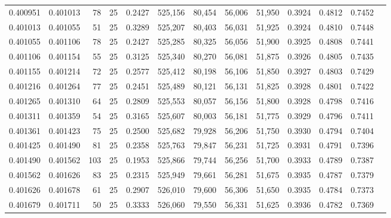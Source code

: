 \begin{tabular}{rrrrrrrrrrrrr}
0.400951 & 0.401013 &    78 &  25 &                                     0.2427 & 525,156 &  80,454 &  56,006 &  51,950 & 0.3924 & 0.4812 & 0.7452 \\
0.401013 & 0.401055 &    51 &  25 &                                     0.3289 & 525,207 &  80,403 &  56,031 &  51,925 & 0.3924 & 0.4810 & 0.7448 \\
0.401055 & 0.401106 &    78 &  25 &                                     0.2427 & 525,285 &  80,325 &  56,056 &  51,900 & 0.3925 & 0.4808 & 0.7441 \\
0.401106 & 0.401154 &    55 &  25 &                                     0.3125 & 525,340 &  80,270 &  56,081 &  51,875 & 0.3926 & 0.4805 & 0.7435 \\
0.401155 & 0.401214 &    72 &  25 &                                     0.2577 & 525,412 &  80,198 &  56,106 &  51,850 & 0.3927 & 0.4803 & 0.7429 \\
0.401216 & 0.401264 &    77 &  25 &                                     0.2451 & 525,489 &  80,121 &  56,131 &  51,825 & 0.3928 & 0.4801 & 0.7422 \\
0.401265 & 0.401310 &    64 &  25 &                                     0.2809 & 525,553 &  80,057 &  56,156 &  51,800 & 0.3928 & 0.4798 & 0.7416 \\
0.401311 & 0.401359 &    54 &  25 &                                     0.3165 & 525,607 &  80,003 &  56,181 &  51,775 & 0.3929 & 0.4796 & 0.7411 \\
0.401361 & 0.401423 &    75 &  25 &                                     0.2500 & 525,682 &  79,928 &  56,206 &  51,750 & 0.3930 & 0.4794 & 0.7404 \\
0.401425 & 0.401490 &    81 &  25 &                                     0.2358 & 525,763 &  79,847 &  56,231 &  51,725 & 0.3931 & 0.4791 & 0.7396 \\
0.401490 & 0.401562 &   103 &  25 &                                     0.1953 & 525,866 &  79,744 &  56,256 &  51,700 & 0.3933 & 0.4789 & 0.7387 \\
0.401562 & 0.401626 &    83 &  25 &                                     0.2315 & 525,949 &  79,661 &  56,281 &  51,675 & 0.3935 & 0.4787 & 0.7379 \\
0.401626 & 0.401678 &    61 &  25 &                                     0.2907 & 526,010 &  79,600 &  56,306 &  51,650 & 0.3935 & 0.4784 & 0.7373 \\
0.401679 & 0.401711 &    50 &  25 &                                     0.3333 & 526,060 &  79,550 &  56,331 &  51,625 & 0.3936 & 0.4782 & 0.7369 \\

\end{tabular}
